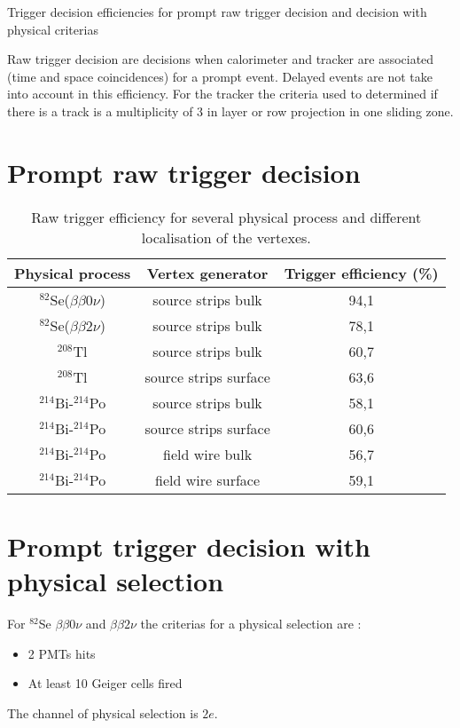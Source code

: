 \documentclass[12pt,a4paper]{article}
\newcommand{\BBZN}{$\beta\beta{}0\nu$}
\newcommand{\BBDN}{$\beta\beta{}2\nu$}
\newcommand{\SE}{$^{82}$Se}
\newcommand{\TL}{$^{208}$Tl}
\newcommand{\BIQ}{$^{214}$Bi}
\newcommand{\POQ}{$^{214}$Po}
\begin{document}
\begin{center}
 \huge{Trigger decision efficiencies for prompt raw trigger decision and decision with physical criterias}
\end{center}

Raw trigger decision are decisions when calorimeter and tracker are associated (time and space coincidences) for a prompt event. Delayed events are not take into account in this efficiency.
For the tracker the criteria used to determined if there is a track is a multiplicity of 3 in layer or row projection in one sliding zone.

\section{Prompt raw trigger decision}
\begin{table}[!h]
 \begin{center}
  \begin{tabular}{|c||c|c|}
    \hline
    Physical process   & Vertex generator      & Trigger efficiency (\%)  \\
    \hline
    \SE(\BBZN)         & source strips bulk    & 94,1 \\
    \SE(\BBDN)         & source strips bulk    & 78,1 \\
    \TL                & source strips bulk    & 60,7 \\
    \TL                & source strips surface & 63,6 \\
    \BIQ-\POQ          & source strips bulk    & 58,1 \\
    \BIQ-\POQ          & source strips surface & 60,6 \\
    \BIQ-\POQ          & field wire bulk       & 56,7 \\
    \BIQ-\POQ          & field wire surface    & 59,1 \\
    \hline
  \end{tabular}
  \end{center}
  \caption{Raw trigger efficiency for several physical process and different localisation of the vertexes.}
\label{raw_efficacity_trigger}
\end{table}

\section{Prompt trigger decision with physical selection}	
For \SE{} \BBZN{} and \BBDN{} the criterias for a physical selection are : 
\begin{itemize}
 \item 2 PMTs hits
 \item At least 10 Geiger cells fired
\end{itemize}
The channel of physical selection is $2e$.\\
\end{document}

